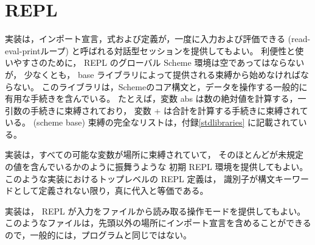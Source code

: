 \section{REPL}

実装は，インポート宣言，式および定義が，一度に入力および評価できる  (read-eval-printループ) と呼ばれる対話型セッションを提供してもよい。
利便性と使いやすさのために， REPL のグローバル Scheme 環境は空であってはならないが，
少なくとも， base ライブラリによって提供される束縛から始めなければならない。
このライブラリは，Schemeのコア構文と，データを操作する一般的に有用な手続きを含んでいる。
たとえば，変数 {\cf abs} は数の絶対値を計算する，一引数の手続きに束縛されており，
変数 {\cf +} は合計を計算する手続きに束縛されている。
 {\cf(scheme base)} 束縛の完全なリストは，付録\ref{stdlibraries} に記載されている。

実装は，すべての可能な変数が場所に束縛されていて，
そのほとんどが未規定の値を含んでいるかのように振舞うような
初期 REPL 環境を提供してもよい。
このような実装におけるトップレベルの REPL 定義は，
識別子が構文キーワードとして定義されない限り，真に代入と等価である。

実装は， REPL が入力をファイルから読み取る操作モードを提供してもよい。
このようなファイルは，先頭以外の場所にインポート宣言を含めることができるので，一般的には，プログラムと同じではない。

